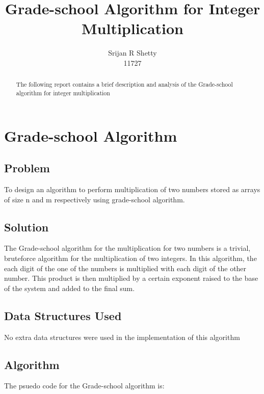 \documentclass[12pt,a4paper,titlepage]{article}
\author{Srijan R Shetty\\11727}
\title{Grade-school Algorithm for Integer Multiplication}
\begin{document}
\maketitle

\begin{abstract}
The following report contains a brief description and analysis of the Grade-school algorithm for integer multiplication
\end{abstract}

\tableofcontents

\newpage

\section{Grade-school Algorithm}

\subsection{Problem}
To design an algorithm to perform multiplication of two numbers stored as arrays of size n and m respectively using grade-school algorithm.

\subsection{Solution}
The Grade-school algorithm for the multiplication for two numbers is a trivial, bruteforce algorithm for the multiplication of two integers. In this algorithm, the each digit of the one of the numbers is multiplied with each digit of the other number. This product is then multiplied by a certain exponent raised to the base of the system and added to the final sum.

\subsection{Data Structures Used}
No extra data structures were used in the implementation of this algorithm

\subsection{Algorithm}
The psuedo code for the Grade-school algorithm is:\\
\end{document}
